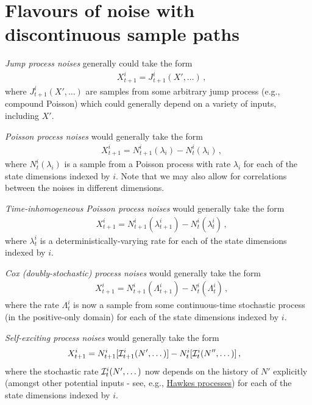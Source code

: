 \documentclass{book}
\begin{document}
\section{\sffamily Flavours of noise with discontinuous sample paths}

\emph{Jump process noises} generally could take the form
\begin{align}
& X^i_{t+1} = J^i_{t+1}(X', \dots )\,,
\end{align}
where $J^i_{t+1}(X', \dots )$ are samples from some arbitrary jump process (e.g., compound Poisson) which could generally depend on a variety of inputs, including $X'$. 

\emph{Poisson process noises} would generally take the form
\begin{align}
& X^i_{t+1} = N^i_{t+1}({\lambda_i})-N^i_{t}({\lambda_i})\,,
\end{align}
where $N^i_{t}({\lambda_i})$ is a sample from a Poisson process with rate $\lambda_i$ for each of the state dimensions indexed by $i$. Note that we may also allow for correlations between the noises in different dimensions.

\emph{Time-inhomogeneous Poisson process noises} would generally take the form
\begin{align}
& X^i_{t+1} = N^i_{t+1}({\lambda^i_{t+1}})-N^i_{t}({\lambda^i_t}) \,,
\end{align}
where $\lambda^i_{t}$ is a deterministically-varying rate for each of the state dimensions indexed by $i$.

\emph{Cox (doubly-stochastic) process noises} would generally take the form
\begin{align}
& X^i_{t+1} = N^i_{t+1}({\Lambda^i_{t+1}})-N^i_{t}({\Lambda^i_{t}}) \,,
\end{align}
where the rate $\Lambda^i_{t}$ is now a sample from some continuous-time stochastic process (in the positive-only domain) for each of the state dimensions indexed by $i$.

\emph{Self-exciting process noises} would generally take the form
\begin{align}
& X^i_{t+1} = N^i_{t+1}[{\cal I}^i_{t+1}(N', \dots)]-N^i_{t}[{\cal I}^i_{t}(N'', \dots)]\,,
\end{align}
where the stochastic rate ${\cal I}^i_{t}(N', \dots)$ now depends on the history of $N'$ explicitly (amongst other potential inputs - see, e.g., \href{https://en.wikipedia.org/wiki/Hawkes_process}{Hawkes processes}) for each of the state dimensions indexed by $i$.
\end{document}
